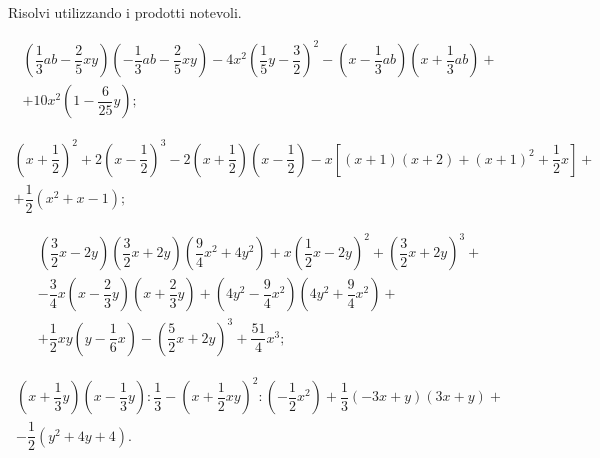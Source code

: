 \begin{esercizio}[\Ast]
 \label{ese:12.43}
Risolvi utilizzando i prodotti notevoli.
 \begin{enumeratea}
 \item
 \begin{multline*}
 \left(\dfrac{1}{3}{ab}-\dfrac{2}{5}{xy}\right)\left(-{\dfrac{1}{3}}{ab}-\dfrac{2}{5}{xy}\right)-4x^{2}\left(\dfrac{1}{5}y-\dfrac{3}{2}\right)^{2}-\left(x-\dfrac{1}{3}{ab}\right)\left(x+\dfrac{1}{3}{ab}\right)+\\
 +10x^{2}\left(1-\dfrac{6}{25}y\right);
 \end{multline*}
 \item
\begin{multline*}
\left(x+\dfrac{1}{2}\right)^{2}+2\left(x-\dfrac{1}{2}\right)^{3}-2\left(x+\dfrac{1}{2}\right)\left(x-\dfrac{1}{2}\right)-x\left[(x+1)(x+2)+(x+1)^{2}+\dfrac{1}{2}x\right]+\\
+\dfrac{1}{2}\left(x^{2}+x-1\right);
\end{multline*} 
 \item
\begin{multline*}
\left(\dfrac{3}{2}x-2y\right)\left(\dfrac{3}{2}x+2y\right)\left(\dfrac{9}{4}x^{2}+4y^{2}\right)+x\left(\dfrac{1}{2}x-2y\right)^{2}+\left(\dfrac{3}{2}x+2y\right)^{3}+\\
-\dfrac{3}{4}x\left(x-\dfrac{2}{3}y\right)\left(x+\dfrac{2}{3}y\right)+\left(4y^{2}-\dfrac{9}{4}x^{2}\right)\left(4y^{2}+\dfrac{9}{4}x^{2}\right)+\\
+\dfrac{1}{2}{xy}\left(y-\dfrac{1}{6}x\right)-\left(\dfrac{5}{2}x+2y\right)^{3}+\dfrac{51}{4}x^{3};
\end{multline*} 
 \item
\begin{multline*}
 \left(x+\dfrac{1}{3}y\right)\left(x-\dfrac{1}{3}y\right):\dfrac{1}{3}-\left(x+\dfrac{1}{2}{xy}\right)^{2}:\left(-{\dfrac{1}{2}}x^2\right)+\dfrac{1}{3}(-3x+y)(3x+y)+\\
 -\dfrac{1}{2}\left(y^{2}+4y+4\right).
\end{multline*}
 \end{enumeratea}
\end{esercizio}

